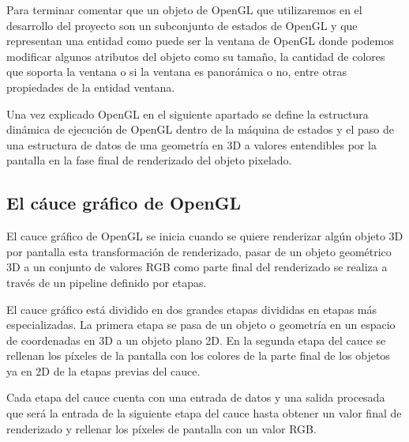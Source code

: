\documentclass[a4paper, 17pt]{book}
\begin{document}
Para terminar comentar que un objeto de OpenGL que utilizaremos en el desarrollo del proyecto son un subconjunto de estados
de OpenGL y que representan una entidad como puede ser la ventana de OpenGL donde podemos modificar algunos atributos del
objeto como su tamaño, la cantidad de colores que soporta la ventana o si la ventana es panorámica o no, entre otras
propiedades de la entidad ventana.

Una vez explicado OpenGL en el siguiente apartado se define la estructura dinámica de ejecución de OpenGL dentro de la máquina
de estados y el paso de una estructura de datos de una geometría en 3D a valores entendibles por la pantalla en la fase final
de renderizado del objeto pixelado.

\subsection{El cáuce gráfico de OpenGL} 
\label{subsec:CauceOpenGL}

El cauce gráfico de OpenGL se inicia cuando se quiere renderizar algún objeto 3D por pantalla esta transformación de renderizado,
pasar de un objeto geométrico 3D a un conjunto de valores RGB como parte final del renderizado se realiza a través de un pipeline
definido por etapas.

El cauce gráfico está dividido en dos grandes etapas divididas en etapas más especializadas. La primera etapa se pasa de un objeto
o geometría en un espacio de coordenadas en 3D a un objeto plano 2D. En la segunda etapa del cauce se rellenan los píxeles de la
pantalla con los colores de la parte final de los objetos ya en 2D de la etapas previas del cauce.

Cada etapa del cauce cuenta con una entrada de datos y una salida procesada que será la entrada de la siguiente etapa del cauce
hasta obtener un valor final de renderizado y rellenar los píxeles de pantalla con un valor RGB.
\end{document}
